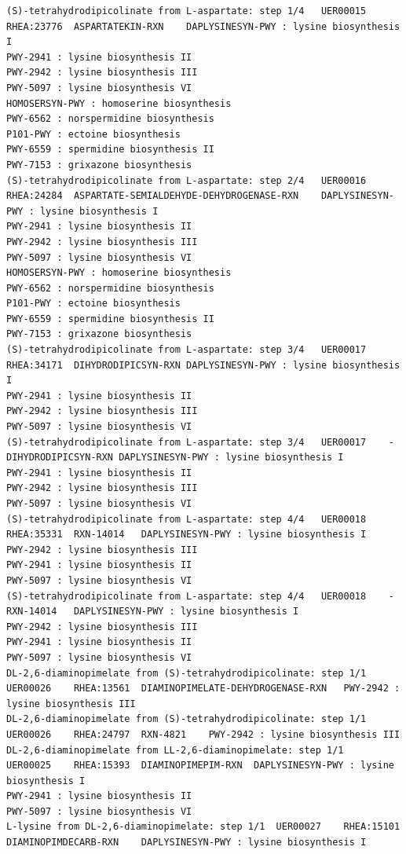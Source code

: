 \begin{adjustbox}{width=\textwidth}
\begin{lstlisting}[basicstyle=\tiny\normalfont\ttfamily,tabsize=2,showtabs=true,caption=DAP\_uer\_metacyc.tsv]
(S)-tetrahydrodipicolinate from L-aspartate: step 1/4	UER00015	RHEA:23776	ASPARTATEKIN-RXN	DAPLYSINESYN-PWY : lysine biosynthesis I 
PWY-2941 : lysine biosynthesis II 
PWY-2942 : lysine biosynthesis III 
PWY-5097 : lysine biosynthesis VI 
HOMOSERSYN-PWY : homoserine biosynthesis 
PWY-6562 : norspermidine biosynthesis 
P101-PWY : ectoine biosynthesis 
PWY-6559 : spermidine biosynthesis II 
PWY-7153 : grixazone biosynthesis 
(S)-tetrahydrodipicolinate from L-aspartate: step 2/4	UER00016	RHEA:24284	ASPARTATE-SEMIALDEHYDE-DEHYDROGENASE-RXN	DAPLYSINESYN-PWY : lysine biosynthesis I 
PWY-2941 : lysine biosynthesis II 
PWY-2942 : lysine biosynthesis III 
PWY-5097 : lysine biosynthesis VI 
HOMOSERSYN-PWY : homoserine biosynthesis 
PWY-6562 : norspermidine biosynthesis 
P101-PWY : ectoine biosynthesis 
PWY-6559 : spermidine biosynthesis II 
PWY-7153 : grixazone biosynthesis 
(S)-tetrahydrodipicolinate from L-aspartate: step 3/4	UER00017	RHEA:34171	DIHYDRODIPICSYN-RXN	DAPLYSINESYN-PWY : lysine biosynthesis I 
PWY-2941 : lysine biosynthesis II 
PWY-2942 : lysine biosynthesis III 
PWY-5097 : lysine biosynthesis VI 
(S)-tetrahydrodipicolinate from L-aspartate: step 3/4	UER00017	-	DIHYDRODIPICSYN-RXN	DAPLYSINESYN-PWY : lysine biosynthesis I 
PWY-2941 : lysine biosynthesis II 
PWY-2942 : lysine biosynthesis III 
PWY-5097 : lysine biosynthesis VI 
(S)-tetrahydrodipicolinate from L-aspartate: step 4/4	UER00018	RHEA:35331	RXN-14014	DAPLYSINESYN-PWY : lysine biosynthesis I 
PWY-2942 : lysine biosynthesis III 
PWY-2941 : lysine biosynthesis II 
PWY-5097 : lysine biosynthesis VI 
(S)-tetrahydrodipicolinate from L-aspartate: step 4/4	UER00018	-	RXN-14014	DAPLYSINESYN-PWY : lysine biosynthesis I 
PWY-2942 : lysine biosynthesis III 
PWY-2941 : lysine biosynthesis II 
PWY-5097 : lysine biosynthesis VI 
DL-2,6-diaminopimelate from (S)-tetrahydrodipicolinate: step 1/1	UER00026	RHEA:13561	DIAMINOPIMELATE-DEHYDROGENASE-RXN	PWY-2942 : lysine biosynthesis III 
DL-2,6-diaminopimelate from (S)-tetrahydrodipicolinate: step 1/1	UER00026	RHEA:24797	RXN-4821	PWY-2942 : lysine biosynthesis III 
DL-2,6-diaminopimelate from LL-2,6-diaminopimelate: step 1/1	UER00025	RHEA:15393	DIAMINOPIMEPIM-RXN	DAPLYSINESYN-PWY : lysine biosynthesis I 
PWY-2941 : lysine biosynthesis II 
PWY-5097 : lysine biosynthesis VI 
L-lysine from DL-2,6-diaminopimelate: step 1/1	UER00027	RHEA:15101	DIAMINOPIMDECARB-RXN	DAPLYSINESYN-PWY : lysine biosynthesis I 

\end{lstlisting}
\end{adjustbox}

